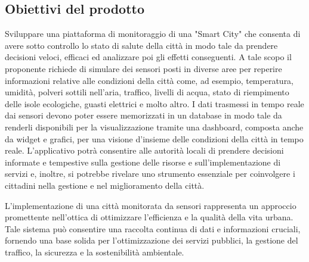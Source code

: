 \subsection{Obiettivi del prodotto}
Sviluppare una piattaforma di monitoraggio di una "Smart City" che consenta di avere sotto
controllo lo stato di salute della città in modo tale da prendere decisioni veloci, efficaci
ed analizzare poi gli effetti conseguenti.
A tale scopo il proponente richiede di simulare dei sensori posti in diverse aree per reperire
informazioni relative alle condizioni della città come, ad esempio, temperatura, umidità,
polveri sottili nell’aria, traffico, livelli di acqua, stato di riempimento delle isole ecologiche,
guasti elettrici e molto altro.
I dati trasmessi in tempo reale dai sensori devono poter essere memorizzati in un database
in modo tale da renderli disponibili per la visualizzazione tramite una dashboard, composta anche da widget e grafici, per una visione d’insieme delle condizioni della città in
tempo reale.
L’applicativo potrà consentire alle autorità locali di prendere decisioni informate e tempestive sulla gestione delle risorse e sull’implementazione di servizi e, inoltre, si potrebbe
rivelare uno strumento essenziale per coinvolgere i cittadini nella gestione e nel miglioramento della città.
\vspace{0.3cm}

L’implementazione di una città monitorata da sensori rappresenta un approccio promettente
nell’ottica di ottimizzare l’efficienza e la qualità della vita urbana. Tale sistema può consentire
una raccolta continua di dati e informazioni cruciali, fornendo una base solida per
l’ottimizzazione dei servizi pubblici, la gestione del traffico, la sicurezza e la sostenibilità
ambientale.

